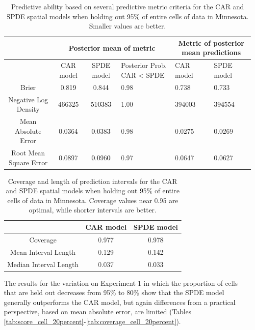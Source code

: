 \documentclass[12pt]{article}
\providecommand{\tabularnewline}{\\}
\begin{document}
\begin{table}
\caption{Predictive ability based on several predictive metric criteria for
the CAR and SPDE spatial models when holding out 95\% of entire cells
of data in Minnesota. Smaller values are better.}


\begin{tabular}{|c|c|c|>{\centering}p{3cm}|>{\centering}p{2.5cm}|>{\centering}p{2.5cm}|}
\hline 
 &
\multicolumn{3}{c|}{{\small{}Posterior mean of metric}} &
\multicolumn{2}{c|}{{\small{}Metric of posterior mean predictions}}\tabularnewline
\hline 
\hline 
 &
{\small{}CAR model} &
{\small{}SPDE model} &
{\small{}Posterior Prob. CAR < SPDE} &
{\small{}CAR model} &
{\small{}SPDE model}\tabularnewline
\hline 
{\small{}Brier} &
{\small{}0.819} &
{\small{}0.844} &
{\small{}0.98} &
{\small{}0.738} &
{\small{}0.733}\tabularnewline
\hline 
{\small{}Negative Log Density} &
{\small{}466325} &
{\small{}510383} &
{\small{}1.00} &
{\small{}394003} &
{\small{}394554}\tabularnewline
\hline 
{\small{}Mean Absolute Error} &
{\small{}0.0364} &
{\small{}0.0383} &
{\small{}0.98} &
{\small{}0.0275} &
{\small{}0.0269}\tabularnewline
\hline 
{\small{}Root Mean Square Error} &
{\small{}0.0897} &
{\small{}0.0960} &
{\small{}0.97} &
{\small{}0.0647} &
{\small{}0.0627}\tabularnewline
\hline 
\end{tabular}

\label{tab:score_cell_fivepercent}
\end{table}


\begin{table}
\caption{Coverage and length of prediction intervals for the CAR and SPDE spatial
models when holding out 95\% of entire cells of data in Minnesota.
Coverage values near 0.95 are optimal, while shorter intervals are
better.}


\begin{tabular}{|c|c|c|}
\hline 
 &
{\small{}CAR model} &
{\small{}SPDE model}\tabularnewline
\hline 
{\small{}Coverage} &
{\small{}0.977} &
{\small{}0.978}\tabularnewline
\hline 
{\small{}Mean Interval Length} &
{\small{}0.129} &
{\small{}0.142}\tabularnewline
\hline 
{\small{}Median Interval Length} &
{\small{}0.037} &
{\small{}0.033}\tabularnewline
\hline 
\end{tabular}

\label{tab:coverage_cell_fivepercent}
\end{table}




The results for the variation on Experiment 1 in which the proportion
of cells that are held out decreases from 95\% to 80\% show that the
SPDE model generally outperforms the CAR model, but again differences
from a practical perspective, based on mean absolute error, are limited
(Tables \ref{tab:score_cell_20percent}-\ref{tab:coverage_cell_20percent}). 
\end{document}
